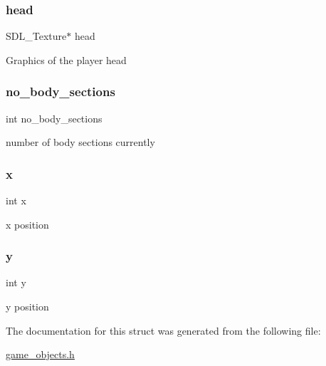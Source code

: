 \subsubsection{\texorpdfstring{head}{head}}
{\footnotesize\ttfamily S\+D\+L\+\_\+\+Texture$\ast$ head}

Graphics of the player head \mbox{\label{structplayer__object_a06948963e49fd8de64945937788fc3f8}} 
\subsubsection{\texorpdfstring{no\_body\_sections}{no\_body\_sections}}
{\footnotesize\ttfamily int no\+\_\+body\+\_\+sections}

number of body sections currently \mbox{\label{structplayer__object_a6150e0515f7202e2fb518f7206ed97dc}} 
\subsubsection{\texorpdfstring{x}{x}}
{\footnotesize\ttfamily int x}

x position \mbox{\label{structplayer__object_a0a2f84ed7838f07779ae24c5a9086d33}} 
\subsubsection{\texorpdfstring{y}{y}}
{\footnotesize\ttfamily int y}

y position 

The documentation for this struct was generated from the following file\+:\begin{DoxyCompactItemize}
\item 
\mbox{\hyperlink{game__objects_8h}{game\+\_\+objects.\+h}}\end{DoxyCompactItemize}
